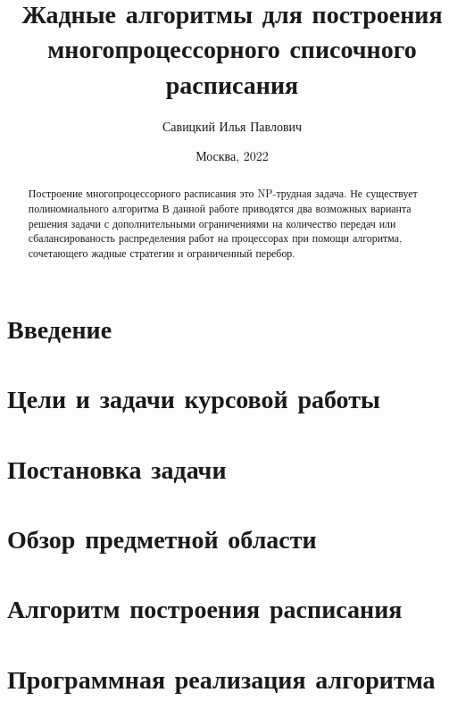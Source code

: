 \documentclass[12pt]{article}
\author{Савицкий Илья Павлович}
\title{Жадные алгоритмы для построения многопроцессорного списочного расписания}
\date{Москва, 2022}
\begin{document}

\newpage
\begin{abstract}
    Построение многопроцессорного расписания это NP-трудная задача. Не существует полиномиального алгоритма  В данной работе приводятся два возможных варианта решения задачи с дополнительными ограничениями на количество передач или сбалансированость распределения работ на процессорах при помощи алгоритма, сочетающего жадные стратегии и ограниченный перебор.
\end{abstract}
\newpage
\tableofcontents
\newpage
\section{Введение}

\newpage
\section{Цели и задачи курсовой работы}

\newpage
\section{Постановка задачи}

\newpage
\section{Обзор предметной области}


\newpage
\section{Алгоритм построения расписания}


\newpage
\section{Программная реализация алгоритма}

\end{document}

